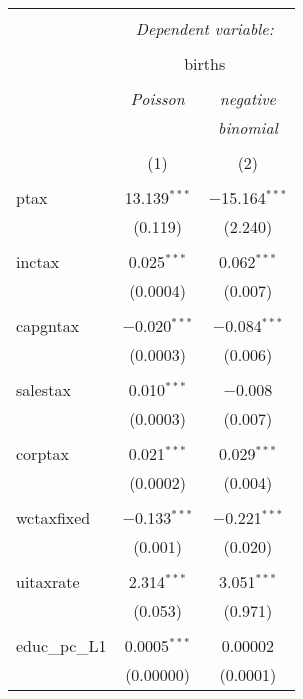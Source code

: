 
\begin{table}[!htbp] \centering 
  \caption{} 
  \label{} 
\begin{tabular}{@{\extracolsep{5pt}}lcc} 
\\[-1.8ex]\hline 
\hline \\[-1.8ex] 
 & \multicolumn{2}{c}{\textit{Dependent variable:}} \\ 
\cline{2-3} 
\\[-1.8ex] & \multicolumn{2}{c}{births} \\ 
\\[-1.8ex] & \textit{Poisson} & \textit{negative} \\ 
 & \textit{} & \textit{binomial} \\ 
\\[-1.8ex] & (1) & (2)\\ 
\hline \\[-1.8ex] 
 ptax & 13.139$^{***}$ & $-$15.164$^{***}$ \\ 
  & (0.119) & (2.240) \\ 
  & & \\ 
 inctax & 0.025$^{***}$ & 0.062$^{***}$ \\ 
  & (0.0004) & (0.007) \\ 
  & & \\ 
 capgntax & $-$0.020$^{***}$ & $-$0.084$^{***}$ \\ 
  & (0.0003) & (0.006) \\ 
  & & \\ 
 salestax & 0.010$^{***}$ & $-$0.008 \\ 
  & (0.0003) & (0.007) \\ 
  & & \\ 
 corptax & 0.021$^{***}$ & 0.029$^{***}$ \\ 
  & (0.0002) & (0.004) \\ 
  & & \\ 
 wctaxfixed & $-$0.133$^{***}$ & $-$0.221$^{***}$ \\ 
  & (0.001) & (0.020) \\ 
  & & \\ 
 uitaxrate & 2.314$^{***}$ & 3.051$^{***}$ \\ 
  & (0.053) & (0.971) \\ 
  & & \\ 
 educ\_pc\_L1 & 0.0005$^{***}$ & 0.00002 \\ 
  & (0.00000) & (0.0001) \\ 

\end{tabular}
\end{table}
